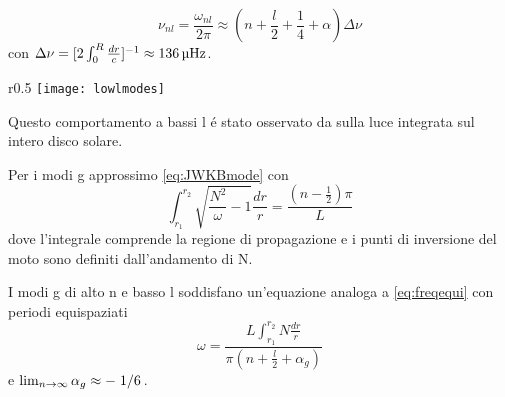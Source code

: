 \documentclass[../main.tex]{subfiles}
\begin{document}
\begin{equation}
\nu_{nl}=\frac{\omega_{nl}}{2\pi}\approx(n+\frac{l}{2}+\frac{1}{4}+\alpha)\Delta\nu\label{eq:freqequi}
\end{equation}
con $\Delta\nu=[2\int_0^R\frac{dr}{c}]^{-1}\approx\SI{136}{\micro\hertz}$.

\begin{wrapfigure}[16]{r}{0.5\textwidth}
\centering
\texttt{[image: lowlmodes]}
\caption{Densit\'a spettrale modi p di basso grado angolare. Da \cite{chr02helioseismology}.}\label{fig:lowlmodes}
\end{wrapfigure}

Questo comportamento a bassi l \'e stato osservato da \cite{cla79solar} sulla luce integrata sul intero disco solare.



Per i modi g approssimo \eqref{eq:JWKBmode} con
\begin{equation}
\int_{r_1}^{r_2}\sqrt{\frac{N^2}{\omega}-1}\frac{dr}{r}=\frac{(n-\frac{1}{2})\pi}{L}
\end{equation}
dove l'integrale comprende la regione di propagazione e i punti di inversione del moto sono definiti dall'andamento di N.

I modi g di alto n e basso l soddisfano un'equazione analoga a \eqref{eq:freqequi} con periodi equispaziati
\begin{equation}
\omega=\frac{L\int_{r_1}^{r_2}N\frac{dr}{r}}{\pi(n+\frac{l}{2}+\alpha_g)}
\end{equation}
e $\lim_{n\to\infty}{\alpha_g}\approx-\left.{1}\middle/{6}\right.$.

\end{document}
